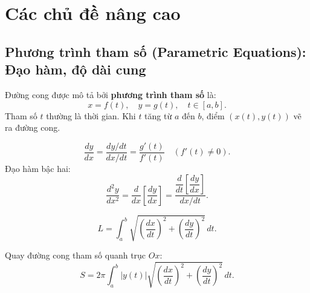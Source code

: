 \documentclass[12pt,a4paper]{article}
\begin{document}
\section{Các chủ đề nâng cao}

\subsection{Phương trình tham số (Parametric Equations): Đạo hàm, độ dài cung}

\begin{dinhnghia}[title={Đường cong tham số}]
  Đường cong được mô tả bởi \textbf{phương trình tham số} là:
  \[
    x = f(t), \quad y = g(t), \quad t \in [a, b].
  \]
  Tham số $t$ thường là thời gian. Khi $t$ tăng từ $a$ đến $b$, điểm $(x(t), y(t))$ vẽ ra đường cong.
\end{dinhnghia}

\begin{congthuc}[title={Đạo hàm theo trục $x$}]
  \[
    \frac{dy}{dx} = \frac{dy/dt}{dx/dt} = \frac{g'(t)}{f'(t)} \quad (f'(t) \ne 0).
  \]
  Đạo hàm bậc hai:
  \[
    \frac{d^2y}{dx^2} = \frac{d}{dx}\!\left[\frac{dy}{dx}\right] = \frac{\dfrac{d}{dt}\!\left[\dfrac{dy}{dx}\right]}{dx/dt}.
  \]
\end{congthuc}

\begin{congthuc}[title={Độ dài cung (Arc Length)}]
  \[
    L = \int_a^b \sqrt{\left(\frac{dx}{dt}\right)^2 + \left(\frac{dy}{dt}\right)^2}\,dt.
  \]
\end{congthuc}

\begin{congthuc}[title={Diện tích mặt tròn xoay (Surface Area)}]
  Quay đường cong tham số quanh trục $Ox$:
  \[
    S = 2\pi \int_a^b |y(t)| \sqrt{\left(\frac{dx}{dt}\right)^2 + \left(\frac{dy}{dt}\right)^2}\,dt.
  \]
\end{congthuc}
\end{document}
